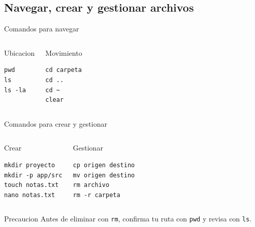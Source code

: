 \documentclass[aspectratio=169]{beamer}
\begin{document}
\subsection{Navegar, crear y gestionar archivos}
\begin{frame}[fragile]{Comandos para navegar}
  \begin{columns}[t]
    \begin{block}{Ubicacion}
\begin{verbatim}
pwd
ls
ls -la
\end{verbatim}
    \end{block}
    \begin{block}{Movimiento}
\begin{verbatim}
cd carpeta
cd ..
cd ~
clear
\end{verbatim}
    \end{block}
  \end{columns}
\end{frame}

\begin{frame}[fragile]{Comandos para crear y gestionar}
  \small
  \begin{columns}[t]
    \begin{block}{Crear}
\begin{verbatim}
mkdir proyecto
mkdir -p app/src
touch notas.txt
nano notas.txt
\end{verbatim}
    \end{block}
    \begin{block}{Gestionar}
\begin{verbatim}
cp origen destino
mv origen destino
rm archivo
rm -r carpeta
\end{verbatim}
    \end{block}
  \end{columns}
  \vfill
  \begin{alertblock}{Precaucion}
    \small Antes de eliminar con \texttt{rm}, confirma tu ruta con \texttt{pwd} y revisa con \texttt{ls}.
  \end{alertblock}
\end{frame}
\end{document}
